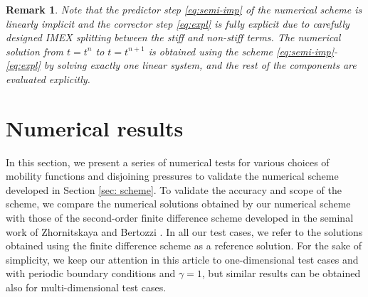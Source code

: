 \documentclass[11pt]{article}
\numberwithin{equation}{section}
\newtheorem{counter example}[theorem]{Counter Example}
\newtheorem{remark}[theorem] {Remark}
\numberwithin{equation}{section}
\numberwithin{equation}{section}
\begin{document}
\begin{remark}
    Note that the predictor step \eqref{eq:semi-imp} of the numerical scheme is linearly implicit and the corrector step \eqref{eq:expl} is fully explicit due to carefully designed IMEX splitting between the stiff and non-stiff terms. The numerical solution from $t=t^n$ to $t=t^{n+1}$ is obtained using the scheme \eqref{eq:semi-imp}-\eqref{eq:expl} by solving exactly one linear system, and the rest of the components are evaluated explicitly.
\end{remark}



\section{Numerical results}\label{sec:numerics}
In this section, we present a series of numerical tests for various choices of mobility functions and disjoining pressures to validate the numerical scheme developed in Section \ref{sec: scheme}. To validate the accuracy and scope of the scheme, we compare the numerical solutions obtained by our numerical scheme with those of the second-order finite difference scheme developed in the seminal work of Zhornitskaya and Bertozzi \cite{zhornitskaya1999positivity}. In all our test cases, we refer to the solutions obtained using the finite difference scheme \cite{zhornitskaya1999positivity} as a reference solution. For the sake of simplicity, we keep our attention in this article to one-dimensional test cases and with periodic boundary conditions and $\gamma=1$, but similar results can be obtained also for multi-dimensional test cases.
\end{document}
